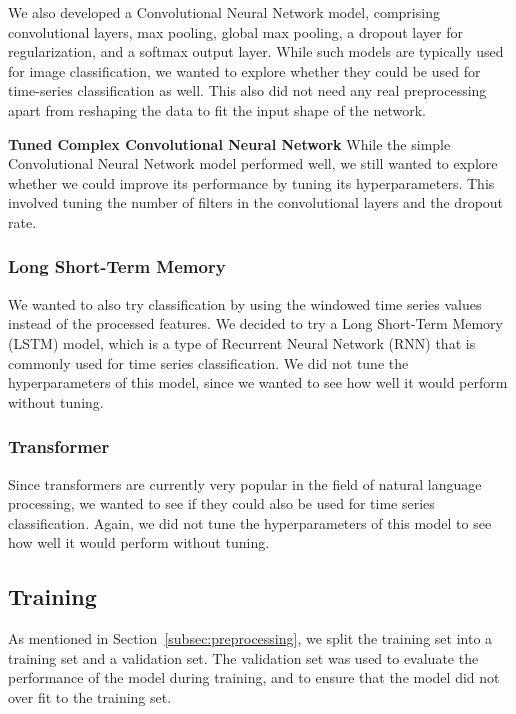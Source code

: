 We also developed a Convolutional Neural Network model, comprising convolutional layers, max pooling, global max pooling, a dropout layer for regularization, and a softmax output layer.
While such models are typically used for image classification, we wanted to explore whether they could be used for time-series classification as well.
This also did not need any real preprocessing apart from reshaping the data to fit the input shape of the network.

\textbf{Tuned Complex Convolutional Neural Network}
While the simple Convolutional Neural Network model performed well, we still wanted to explore whether we could improve its performance by tuning its hyperparameters.
This involved tuning the number of filters in the convolutional layers and the dropout rate.

\subsubsection{Long Short-Term Memory}

We wanted to also try classification by using the windowed time series values instead of the processed features.
We decided to try a Long Short-Term Memory (LSTM) model, which is a type of Recurrent Neural Network (RNN) that is commonly used for time series classification.
We did not tune the hyperparameters of this model, since we wanted to see how well it would perform without tuning.

\subsubsection{Transformer}

Since transformers are currently very popular in the field of natural language processing, we wanted to see if they could also be used for time series classification.
Again, we did not tune the hyperparameters of this model to see how well it would perform without tuning.

\subsection{Training}\label{subsec:training}

As mentioned in Section~\ref{subsec:preprocessing}, we split the training set into a training set and a validation set.
The validation set was used to evaluate the performance of the model during training, and to ensure that the model did not over fit to the training set.

